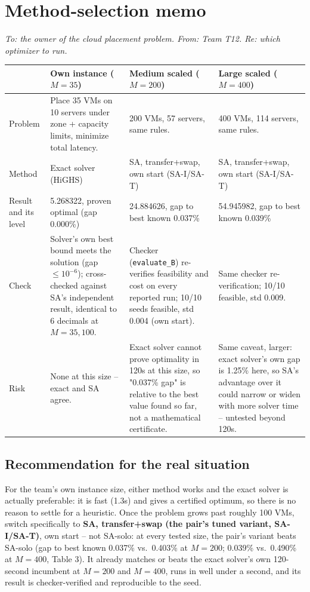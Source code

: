 \documentclass[11pt,a4paper]{article}
\begin{document}
\section{Method-selection memo}

\emph{To: the owner of the cloud placement problem. From: Team T12. Re: which optimizer to run.}

\begin{tabularx}{\textwidth}{@{}lXXX@{}}
\toprule
 & Own instance ($M{=}35$) & Medium scaled ($M{=}200$) & Large scaled ($M{=}400$)\\
\midrule
Problem & Place 35 VMs on 10 servers under zone + capacity limits, minimize total latency. & 200 VMs, 57 servers, same rules. & 400 VMs, 114 servers, same rules.\\
Method & Exact solver (HiGHS) & SA, transfer+swap, own start (SA-I/SA-T) & SA, transfer+swap, own start (SA-I/SA-T)\\
Result and its level & 5.268322, proven optimal (gap 0.000\%) & 24.884626, gap to best known 0.037\% & 54.945982, gap to best known 0.039\%\\
Check & Solver's own best bound meets the solution (gap $\le10^{-6}$); cross-checked against SA's independent result, identical to 6 decimals at $M{=}35,100$. & Checker (\texttt{evaluate\_B}) re-verifies feasibility and cost on every reported run; 10/10 seeds feasible, std 0.004 (own start). & Same checker re-verification; 10/10 feasible, std 0.009.\\
Risk & None at this size -- exact and SA agree. & Exact solver cannot prove optimality in 120s at this size, so "0.037\% gap" is relative to the best value found so far, not a mathematical certificate. & Same caveat, larger: exact solver's own gap is 1.25\% here, so SA's advantage over it could narrow or widen with more solver time -- untested beyond 120s.\\
\bottomrule
\end{tabularx}

\subsection*{Recommendation for the real situation}
For the team's own instance size, either method works and the exact solver is actually preferable: it is fast (1.3s) and gives a certified optimum, so there is no reason to settle for a heuristic. Once the problem grows past roughly 100 VMs, switch specifically to \textbf{SA, transfer+swap (the pair's tuned variant, SA-I/SA-T)}, own start -- not SA-solo: at every tested size, the pair's variant beats SA-solo (gap to best known 0.037\% vs.\ 0.403\% at $M{=}200$; 0.039\% vs.\ 0.490\% at $M{=}400$, Table 3). It already matches or beats the exact solver's own 120-second incumbent at $M{=}200$ and $M{=}400$, runs in well under a second, and its result is checker-verified and reproducible to the seed.
\end{document}
